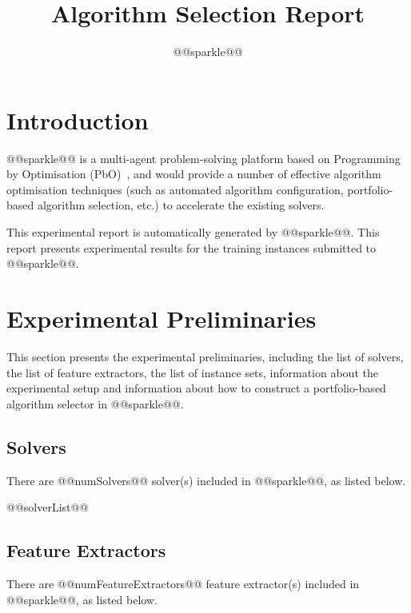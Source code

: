 \documentclass[british]{article}
\title{Algorithm Selection Report}
\author{ @@sparkle@@ }
\newif\iftest
\begin{document}
\maketitle %


\section{Introduction}
\label{sec:Introduction}

@@sparkle@@ \cite{Hoos15} is a multi-agent problem-solving platform based on Programming by Optimisation (PbO)~\cite{Hoos12}, and would provide a number of effective algorithm optimisation techniques (such as automated algorithm configuration, portfolio-based algorithm selection, etc.) to accelerate the existing solvers.

This experimental report is automatically generated by @@sparkle@@. This report presents experimental results for the training instances submitted to @@sparkle@@\iftest, as well as for running the @@sparkle@@ portfolio selector to solve the test instances in the instance set @@testInstanceClass@@\fi.

\section{Experimental Preliminaries}
\label{sec:Experimental_Preliminaries}

This section presents the experimental preliminaries, including the list of solvers, the list of feature extractors, the list of instance sets, information about the experimental setup and information about how to construct a portfolio-based algorithm selector in @@sparkle@@.

\subsection{Solvers}
\label{sec:Solvers}
There are @@numSolvers@@ solver(s) included in @@sparkle@@, as listed below.

\begin{enumerate} 
@@solverList@@
\end{enumerate}

\subsection{Feature Extractors}
\label{sec:Feature_Extractors}
There are @@numFeatureExtractors@@ feature extractor(s) included in @@sparkle@@, as listed below.
\end{document}
